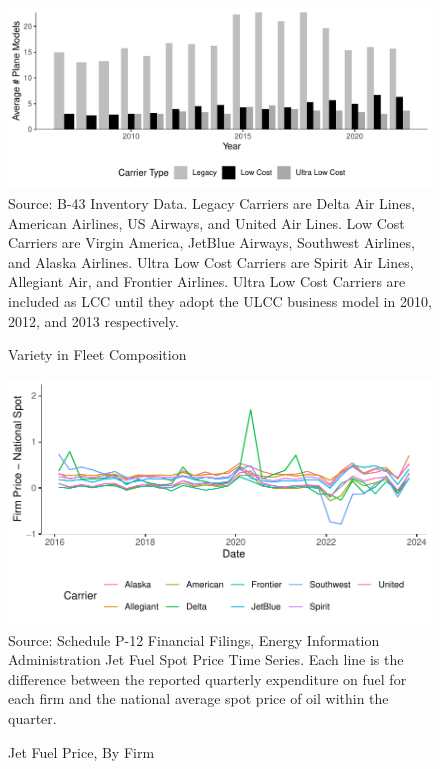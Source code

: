 \documentclass{article}
\begin{document}
\begin{appendices}
	\begin{figure}[h]
		\caption{Variety in Fleet Composition}
		\label{fig:Fleet_Composition}
		\includegraphics[width = \linewidth]{average_plane_types_in_use.pdf}
		\footnotesize{Source: B-43 Inventory Data. Legacy Carriers are Delta Air Lines, American Airlines, US Airways, and United Air Lines. Low Cost Carriers are Virgin America, JetBlue Airways, Southwest Airlines, and Alaska Airlines. Ultra Low Cost Carriers are Spirit Air Lines, Allegiant Air, and Frontier Airlines. Ultra Low Cost Carriers are included as LCC until they adopt the ULCC business model in  2010,  2012, and  2013 respectively.}
	\end{figure}

\begin{figure}
	\caption{Jet Fuel Price, By Firm}
	\label{fig:JetFuel}
	\includegraphics[width = \linewidth]{Fuel_Price_Compare}
	\footnotesize{Source: Schedule P-12 Financial Filings, Energy Information Administration Jet Fuel Spot Price Time Series. Each line is the difference between the reported quarterly expenditure on fuel for each firm and the national average spot price of oil within the quarter.}
\end{figure}




\end{appendices}
\end{document}
